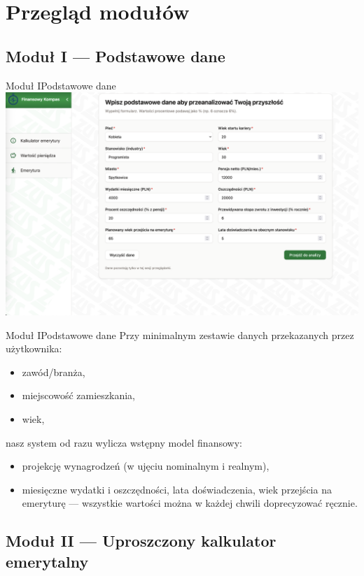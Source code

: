 \section{Przegląd modułów}

\subsection{Moduł I --- Podstawowe dane}

\begin{frame}[t]{Moduł I}{Podstawowe dane}
  \includegraphics[width=.8\textwidth]{img/module_1_basic_data}
\end{frame}

\begin{frame}[t]{Moduł I}{Podstawowe dane}
Przy minimalnym zestawie danych przekazanych przez użytkownika:
\pause
\begin{itemize}
  \item zawód/branża,
  \pause
  \item miejscowość zamieszkania,
  \pause
  \item wiek,
\end{itemize}
\pause
nasz system od razu wylicza wstępny model finansowy:
\begin{itemize}
  \pause
  \item projekcję wynagrodzeń (w ujęciu nominalnym i realnym),
  \pause
  \item miesięczne wydatki i oszczędności, lata doświadczenia, wiek przejścia na emeryturę ---
        wszystkie wartości można w każdej chwili doprecyzować ręcznie.
\end{itemize}
\end{frame}

\subsection{Moduł II --- Uproszczony kalkulator emerytalny}

